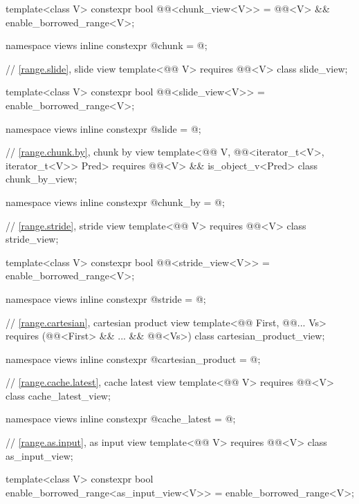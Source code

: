 \begin{codeblock}
{  template<class V>
    constexpr bool @@<chunk_view<V>> =
      @@<V> && enable_borrowed_range<V>;

  namespace views { inline constexpr @\unspecnc@ chunk = @\unspecnc@; }

  // \ref{range.slide}, slide view
  template<@@ V>
    requires @@<V>
  class slide_view;

  template<class V>
    constexpr bool @@<slide_view<V>> =
      enable_borrowed_range<V>;

  namespace views { inline constexpr @\unspecnc@ slide = @\unspecnc@; }

  // \ref{range.chunk.by}, chunk by view
  template<@@ V, @@<iterator_t<V>, iterator_t<V>> Pred>
    requires @@<V> && is_object_v<Pred>
  class chunk_by_view;

  namespace views { inline constexpr @\unspecnc@ chunk_by = @\unspecnc@; }

  // \ref{range.stride}, stride view
  template<@@ V>
    requires @@<V>
  class stride_view;

  template<class V>
    constexpr bool @@<stride_view<V>> =
      enable_borrowed_range<V>;

  namespace views { inline constexpr @\unspecnc@ stride = @\unspecnc@; }

  // \ref{range.cartesian}, cartesian product view
  template<@@ First, @@... Vs>
    requires (@@<First> && ... && @@<Vs>)
  class cartesian_product_view;

  namespace views { inline constexpr @\unspecnc@ cartesian_product = @\unspecnc@; }

  // \ref{range.cache.latest}, cache latest view
  template<@@ V>
    requires @@<V>
  class cache_latest_view;

  namespace views { inline constexpr @\unspec@ cache_latest = @\unspec@; }

  // \ref{range.as.input}, as input view
  template<@@ V>
    requires @@<V>
  class as_input_view;

  template<class V>
    constexpr bool enable_borrowed_range<as_input_view<V>> =
      enable_borrowed_range<V>;

}
\end{codeblock}
